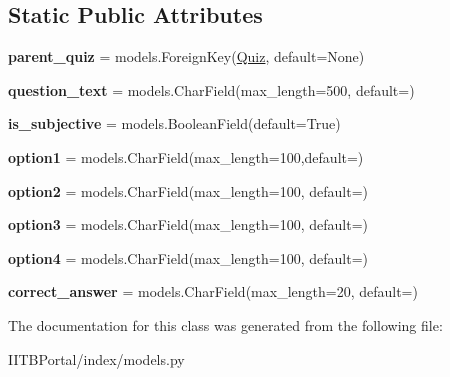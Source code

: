 \subsection*{Static Public Attributes}
\begin{DoxyCompactItemize}
\item 
\mbox{\label{classindex_1_1models_1_1Question_a6765153712626386ee7aeacfccb88b8d}} 
{\bfseries parent\+\_\+quiz} = models.\+Foreign\+Key(\hyperlink{classindex_1_1models_1_1Quiz}{Quiz}, default=None)
\item 
\mbox{\label{classindex_1_1models_1_1Question_aba3999288f1bbcfcc60733a164141564}} 
{\bfseries question\+\_\+text} = models.\+Char\+Field(max\+\_\+length=500, default=\textquotesingle{}\textquotesingle{})
\item 
\mbox{\label{classindex_1_1models_1_1Question_a46cecd0a4b6d40429fc0634d67bb426e}} 
{\bfseries is\+\_\+subjective} = models.\+Boolean\+Field(default=True)
\item 
\mbox{\label{classindex_1_1models_1_1Question_ac4c3735b7a88c3d42e002a614089237b}} 
{\bfseries option1} = models.\+Char\+Field(max\+\_\+length=100,default=\textquotesingle{}\textquotesingle{})
\item 
\mbox{\label{classindex_1_1models_1_1Question_a59813119e7b19938b6a67cb4243a2bbf}} 
{\bfseries option2} = models.\+Char\+Field(max\+\_\+length=100, default=\textquotesingle{}\textquotesingle{})
\item 
\mbox{\label{classindex_1_1models_1_1Question_a138da998563d6bcd752f12f498643794}} 
{\bfseries option3} = models.\+Char\+Field(max\+\_\+length=100, default=\textquotesingle{}\textquotesingle{})
\item 
\mbox{\label{classindex_1_1models_1_1Question_a9432cdc5a708bb8c4b1dcbdfa32c943f}} 
{\bfseries option4} = models.\+Char\+Field(max\+\_\+length=100, default=\textquotesingle{}\textquotesingle{})
\item 
\mbox{\label{classindex_1_1models_1_1Question_a0fa074f37ab9758a21e2ede5a86443b7}} 
{\bfseries correct\+\_\+answer} = models.\+Char\+Field(max\+\_\+length=20, default=\textquotesingle{}\textquotesingle{})
\end{DoxyCompactItemize}


The documentation for this class was generated from the following file\+:\begin{DoxyCompactItemize}
\item 
I\+I\+T\+B\+Portal/index/models.\+py\end{DoxyCompactItemize}
